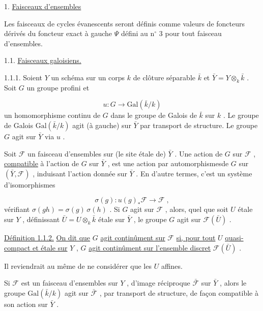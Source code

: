 

1. \underline{Faisceaux d'ensembles}

Les faisceaux de cycles évanescents seront définis comme valeurs de foncteurs dérivés du foncteur exact à gauche $\Psi$ défini au n$^{\circ}$ 3 pour tout faisceau d'ensembles.


1.1. \underline{Faisceaux galoisiens.}

1.1.1. Soient $Y$ un schéma sur un corps $k$ de clôture séparable $\bar{k}$ et $\bar{Y} = Y \otimes_{k} \bar{k}$ . Soit $G$ un groupe profini et

\begin{equation*}
u : G \longrightarrow \mathrm{Gal}(\bar{k}/k)
\end{equation*}
un homomorphisme continu de $G$ dans le groupe de Galois de $\bar{k}$ sur $k$ . Le groupe de Galois $\mathrm{Gal}(\bar{k}/k)$ agit (à gauche) sur $\bar{Y}$ par transport de structure. Le groupe $G$ agit sur $\bar{Y}$ via $u$ .

Soit $\mathcal{F}$ un faisceau d'ensembles sur (le site étale de) $\bar{Y}$ . Une action de $G$ sur $\mathcal{F}$ , \underline{compatible} à l'action de $G$ sur $\bar{Y}$ , est une action par automorphismesde $G$ sur $(\bar{Y}, \mathcal{F} )$ , induisant l'action donnée sur $\bar{Y}$ . En d'autre termes, c'est un système d'isomorphismes

\begin{equation*}
\sigma(g) : u(g)_{*} \mathcal{F} \longrightarrow \mathcal{F} \;,
\end{equation*}
vérifiant $\sigma(gh) = \sigma(g)\, \sigma(h)$ . Si $G$ agit sur $\mathcal{F}$ , alors, quel que soit $U$ étale sur $Y$ , définissant $\bar{U} = U \otimes_{k} \bar{k}$ étale sur $\bar{Y}$ , le groupe $G$ agit sur $\mathcal{F}(\bar{U})$ .

\underline{Définition 1.1.2.} \underline{On dit que} $G$ \underline{agit continûment sur} $\mathcal{F}$ \underline{si, pour tout} $U$ \underline{quasi-compact et étale sur} $Y$ , $G$ \underline{agit continûment sur l'ensemble discret} $\mathcal{F}(\bar{U})$ .

Il reviendrait au même de ne considérer que les $U$ affines.

Si $\mathcal{F}$ est un faisceau d'ensembles sur $Y$ , d'image réciproque $\bar{\mathcal{F}}$ sur $\bar{Y}$ , alors le groupe $\mathrm{Gal}(\bar{k}/k)$ agit sur $\bar{\mathcal{F}}$ , par transport de structure, de façon compatible à son action sur $\bar{Y}$ .


